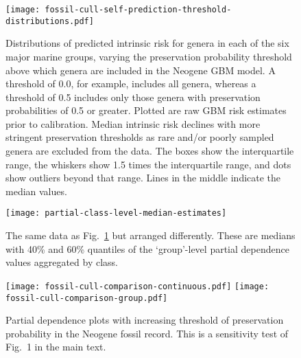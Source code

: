 \documentclass[11pt]{article}
\begin{document}
\begin{figure}[htbp]
\begin{center}
\texttt{[image: fossil-cull-self-prediction-threshold-distributions.pdf]}
\caption{Distributions of predicted intrinsic risk for genera in each of the six major marine groups, varying the preservation probability threshold above which genera are included in the Neogene GBM model. A threshold of 0.0, for example, includes all genera, whereas a threshold of 0.5 includes only those genera with preservation probabilities of 0.5 or greater. Plotted are raw GBM risk estimates prior to calibration. Median intrinsic risk declines with more stringent preservation thresholds as rare and/or poorly sampled genera are excluded from the data. The boxes show the interquartile range, the whiskers show 1.5 times the interquartile range, and dots show outliers beyond that range. Lines in the middle indicate the median values.}
\label{fig:ext-boxplots-paleo-culls}
\end{center}
\end{figure}

\clearpage

\begin{figure}[htbp]
\begin{center}
\texttt{[image: partial-class-level-median-estimates]}
\caption{The same data as Fig.~\ref{fig:ext-boxplots-paleo-culls} but arranged differently. These are medians with 40\% and 60\% quantiles of the `group'-level partial dependence values aggregated by class.}
\label{fig:class-level-partial-order}
\end{center}
\end{figure}

\clearpage

\begin{figure}[htbp]
\begin{center}
\texttt{[image: fossil-cull-comparison-continuous.pdf]}
\texttt{[image: fossil-cull-comparison-group.pdf]}
\caption{Partial dependence plots with increasing threshold of preservation probability in the Neogene fossil record. This is a sensitivity test of Fig.~1 in the main text.}
\label{fig:partial-paleo-culls}
\end{center}
\end{figure}

\clearpage

%
\end{document}
